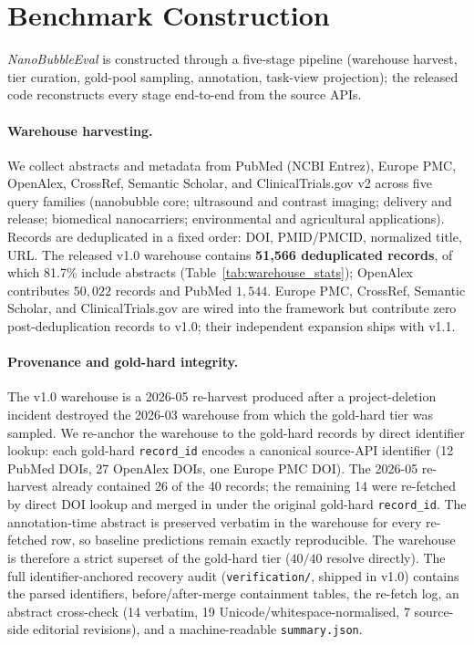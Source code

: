 \documentclass{article}
\begin{document}
\section{Benchmark Construction}
\label{sec:construction}

\textit{NanoBubbleEval} is constructed through a five-stage pipeline (warehouse harvest, tier curation, gold-pool sampling, annotation, task-view projection); the released code reconstructs every stage end-to-end from the source APIs.

\paragraph{Warehouse harvesting.}
We collect abstracts and metadata from PubMed (NCBI Entrez), Europe PMC, OpenAlex, CrossRef, Semantic Scholar, and ClinicalTrials.gov v2 across five query families (nanobubble core; ultrasound and contrast imaging; delivery and release; biomedical nanocarriers; environmental and agricultural applications). Records are deduplicated in a fixed order: DOI, PMID/PMCID, normalized title, URL. The released v1.0 warehouse contains \textbf{51{,}566 deduplicated records}, of which 81.7\% include abstracts (Table~\ref{tab:warehouse_stats}); OpenAlex contributes $50{,}022$ records and PubMed $1{,}544$. Europe PMC, CrossRef, Semantic Scholar, and ClinicalTrials.gov are wired into the framework but contribute zero post-deduplication records to v1.0; their independent expansion ships with v1.1.

\paragraph{Provenance and gold-hard integrity.}
The v1.0 warehouse is a 2026-05 re-harvest produced after a project-deletion incident destroyed the 2026-03 warehouse from which the gold-hard tier was sampled. We re-anchor the warehouse to the gold-hard records by direct identifier lookup: each gold-hard \texttt{record\_id} encodes a canonical source-API identifier (12 PubMed DOIs, 27 OpenAlex DOIs, one Europe PMC DOI). The 2026-05 re-harvest already contained 26 of the 40 records; the remaining 14 were re-fetched by direct DOI lookup and merged in under the original gold-hard \texttt{record\_id}. The annotation-time abstract is preserved verbatim in the warehouse for every re-fetched row, so baseline predictions remain exactly reproducible. The warehouse is therefore a strict superset of the gold-hard tier ($40/40$ resolve directly). The full identifier-anchored recovery audit (\texttt{verification/}, shipped in v1.0) contains the parsed identifiers, before/after-merge containment tables, the re-fetch log, an abstract cross-check (14 verbatim, 19 Unicode/whitespace-normalised, 7 source-side editorial revisions), and a machine-readable \texttt{summary.json}.
\end{document}
